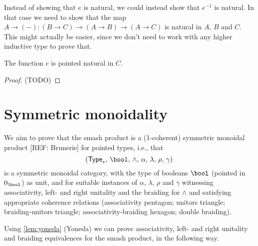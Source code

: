 \documentclass{article}
\newcommand{\smsh}{\wedge}
\newcommand{\pType}{\mathsf{Type}_\ast}
\begin{document}
\begin{rmk}
  Instead of showing that $e$ is natural, we could instead show that $e^{-1}$ is natural. In
  that case we need to show that the map $A\to({-}):(B\to C)\to(A\to B)\to(A\to C)$ is natural in
  $A$, $B$ and $C$. This might actually be easier, since we don't need to work with any higher
  inductive type to prove that.
\end{rmk}

\begin{lem}\label{lem:e-pointed-natural}
	The function $e$ is pointed natural in $C$.
\end{lem}

\begin{proof}
	(TODO)
\end{proof}

\section{Symmetric monoidality}
We aim to prove that the smash product is a (1-coherent) symmetric monoidal product [REF: Brunerie] for pointed types, i.e., that
\[(\pType,\, \bool,\, \smsh,\, \alpha,\, \lambda,\, \rho,\, \gamma)\]
is a symmetric monoidal category, with the type of booleans $\bool$ (pointed in $0_\bool$) as unit, and for suitable instances of $\alpha$, $\lambda$, $\rho$ and $\gamma$ witnessing associativity, left- and right unitality and the braiding for $\smsh$ and satisfying appropriate coherence relations (associativity pentagon; unitors triangle; braiding-unitors triangle; associativity-braiding hexagon; double braiding).

Using \autoref{lem:yoneda} (Yoneda) we can prove associativity, left- and right unitality and braiding equivalences for the smash product, in the following way.
\end{document}
